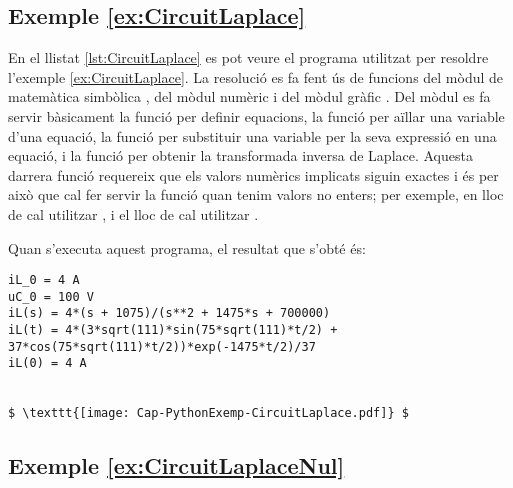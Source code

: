 \hypertarget{exemple:CircuitLaplace}{\subsection{Exemple \ref*{ex:CircuitLaplace} \CircuitLaplace}}
En el llistat \vref{lst:CircuitLaplace} es pot veure el programa utilitzat per resoldre l'exemple \vref{ex:CircuitLaplace}. La resolució es fa fent ús de funcions del mòdul de matemàtica simbòlica , del mòdul numèric  i del mòdul gràfic  . Del mòdul  es fa servir bàsicament la funció  per definir equacions,  la funció  per aïllar una variable d'una equació, la funció  per substituir  una variable per la seva expressió en una equació, i la   funció  per obtenir la transformada inversa de Laplace. Aquesta  darrera funció requereix que els valors numèrics implicats siguin exactes i és per això que cal fer servir la funció  quan tenim valors no enters; per exemple, en lloc de  cal utilitzar , i el lloc de  cal utilitzar .


Quan s'executa aquest programa, el resultat que s'obté és:
\lstset{
	language=,
	numbers=none,
	frame=none
}
\begin{lstlisting}[mathescape=true]
iL_0 = 4 A
uC_0 = 100 V
iL(s) = 4*(s + 1075)/(s**2 + 1475*s + 700000)
iL(t) = 4*(3*sqrt(111)*sin(75*sqrt(111)*t/2) + 37*cos(75*sqrt(111)*t/2))*exp(-1475*t/2)/37
iL(0) = 4 A


$ \texttt{[image: Cap-PythonExemp-CircuitLaplace.pdf]} $
\end{lstlisting} 



\hypertarget{exemple:CircuitLaplaceNul}{\subsection{Exemple \ref*{ex:CircuitLaplaceNul} \CircuitLaplaceNul}}

